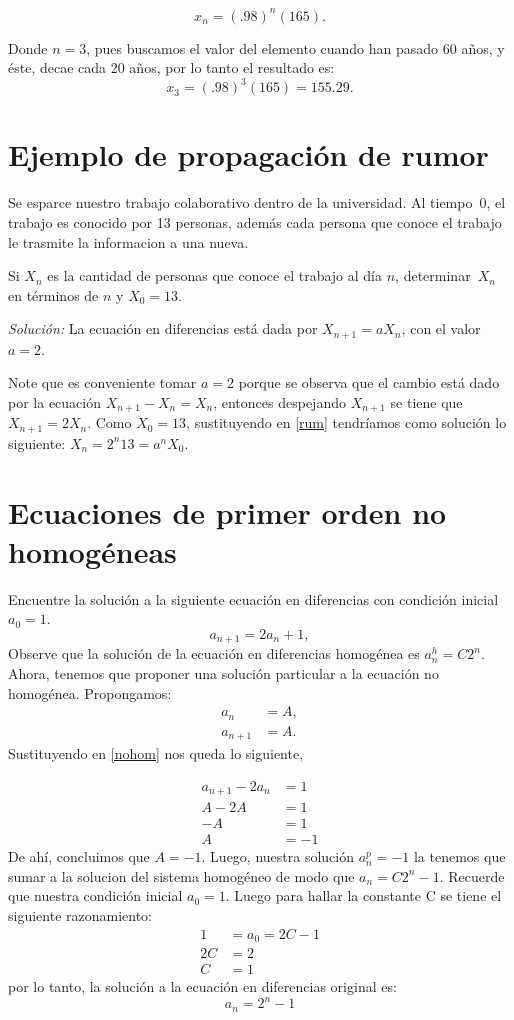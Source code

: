 \documentclass{report}
\begin{document}
$$x_{n}=(.98)^n(165).$$

Donde $n=3$, pues buscamos el valor del elemento cuando han pasado 60
años, y éste, decae cada 20 años, por lo tanto el resultado es:
$$x_{3}=(.98)^3(165)= 155.29.$$

\section{Ejemplo de propagación de rumor}

Se esparce nuestro trabajo colaborativo dentro de la universidad. Al
tiempo~0, el trabajo es conocido por 13 personas, además cada persona que
conoce el trabajo le trasmite la informacion a una nueva.

Si $X_n$ es la cantidad de personas que conoce el trabajo al día  $n$,
determinar~$X_n$ en términos de $n$ y $X_0=13$.

\textit{Solución:} La ecuación en diferencias está dada por
$X_{n+1}=aX_n$, con el valor~$a=2$.

Note que es conveniente tomar $a=2$ porque se observa que el cambio
está dado por la ecuación $X_{n+1}-X_{n}=X_{n}$, entonces despejando
$X_{n+1}$ se tiene que~$X_{n+1}=2X_n$.
 \label{rum}
 Como $X_0=13$, sustituyendo en \ref{rum} tendríamos como solución lo siguiente:
 $X_n=2^n13=a^nX_0$.


\section{Ecuaciones de primer orden no homogéneas}
Encuentre la solución a la siguiente ecuación en diferencias con
condición inicial $a_{0}=1$.
\begin{equation}
  \label{nohom}
  a_{n+1}=2a_{n}+1,
\end{equation}
Observe que la solución de la ecuación en diferencias homogénea es
$a_{n}^h=C2^n$.  Ahora, tenemos que proponer una solución particular a
la ecuación no homogénea.  Propongamos:
\begin{align*}
 a_n&=A,\\
  a_{n+1}&=A.
\end{align*}
Sustituyendo en \ref{nohom} nos queda lo siguiente,

\begin{align*}
  a_{n+1}-2a_{n}&=1\\
  A-2A&=1\\
  -A&=1\\
  A&=-1
\end{align*}
De ahí, concluimos que $A=-1$.  Luego, nuestra solución $a_n^p=-1$ la
tenemos que sumar a la solucion del sistema homogéneo de modo que
$a_{n}=C2^n-1$.  Recuerde que nuestra condición inicial
$a_{0}=1$. Luego para hallar la constante C se tiene el siguiente
razonamiento:
\begin{align*}
1&=a_{0}=2C-1\\
2C&=2\\
  C&=1
\end{align*}  
por lo tanto, la solución a la ecuación en diferencias original es:
$$a_{n}=2^n-1$$
\end{document}
